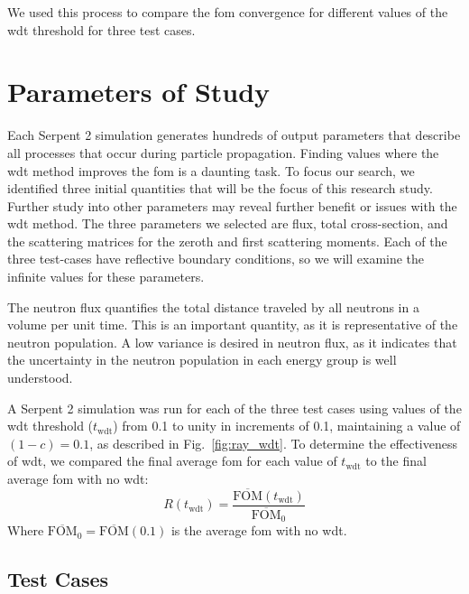 We used this process to compare the \gls{fom} convergence for
different values of the \gls{wdt} threshold for three test cases.

\section{Parameters of Study}
\label{sec:parameters}
Each Serpent 2 simulation generates hundreds of output parameters that
describe all processes that occur during particle propagation. Finding
values where the \gls{wdt} method improves the \gls{fom} is a daunting
task. To focus our search, we identified three initial quantities that
will be the focus of this research study. Further study into other
parameters may reveal further benefit or issues with the \gls{wdt}
method. The three parameters we selected are flux, 
total cross-section, and the scattering matrices for the
zeroth and first scattering moments. Each of the three test-cases have
reflective boundary conditions, so we will examine the infinite values for these
parameters.

The neutron flux quantifies the total distance traveled by all
neutrons in a volume per unit time. This is an important quantity, as
it is representative of the neutron population. A low variance is
desired in neutron flux, as it indicates that the uncertainty in the
neutron population in each energy group is well
understood.

A Serpent 2 simulation was run for each of the three test cases using
values of the \gls{wdt} threshold ($t_\mathrm{wdt}$) from 0.1 to unity in increments of
0.1, maintaining a value of $(1-c) = 0.1$, as described in
Fig.~\ref{fig:ray_wdt}. To determine the effectiveness of \gls{wdt},
we compared the final average \gls{fom} for each value of
$t_{\mathrm{wdt}}$ to the final average \gls{fom} with no \gls{wdt}:
\begin{equation*}
  R(t_{\mathrm{wdt}}) =
  \frac{\overline{\mathrm{FOM}}(t_\mathrm{wdt})}{\overline{\mathrm{FOM}}_0}
\end{equation*}
Where $\overline{\mathrm{FOM}}_0 =
\overline{\mathrm{FOM}}(0.1)$ is
the average \gls{fom} with no \gls{wdt}.

\subsection{Test Cases}
\label{sec:test_cases}

